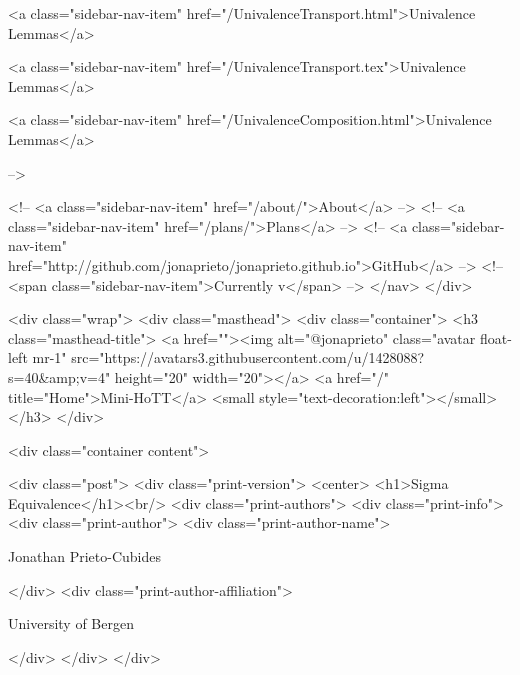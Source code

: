       
    
      
        
          <a class="sidebar-nav-item" href="/UnivalenceTransport.html">Univalence Lemmas</a>
        
      
    
      
        
          <a class="sidebar-nav-item" href="/UnivalenceTransport.tex">Univalence Lemmas</a>
        
      
    
      
        
          <a class="sidebar-nav-item" href="/UnivalenceComposition.html">Univalence Lemmas</a>
        
      
     -->

    <!-- <a class="sidebar-nav-item" href="/about/">About</a> -->
    <!-- <a class="sidebar-nav-item" href="/plans/">Plans</a> -->
    <!-- <a class="sidebar-nav-item" href="http://github.com/jonaprieto/jonaprieto.github.io">GitHub</a> -->
    <!-- <span class="sidebar-nav-item">Currently v</span> -->
  </nav>
</div>

    <div class="wrap">
      <div class="masthead">
        <div class="container">
          <h3 class="masthead-title">
            <a href=""><img alt="@jonaprieto" class="avatar float-left mr-1" src="https://avatars3.githubusercontent.com/u/1428088?s=40&amp;v=4" height="20" width="20"></a>
            <a href="/" title="Home">Mini-HoTT</a>
            <small style="text-decoration:left"></small>
          </h3>
        </div>
      
      <div class="container content">
        







<div class="post">
  <div class="print-version">
    <center>
      <h1>Sigma Equivalence</h1><br/>
        <div class="print-authors">
          <div class="print-info">
            <div class="print-author">
              <div class="print-author-name">
                
                  Jonathan Prieto-Cubides
                
              </div>
              <div class="print-author-affiliation">
                
                  University of Bergen
                
                </div>
            </div>
          </div>
          
